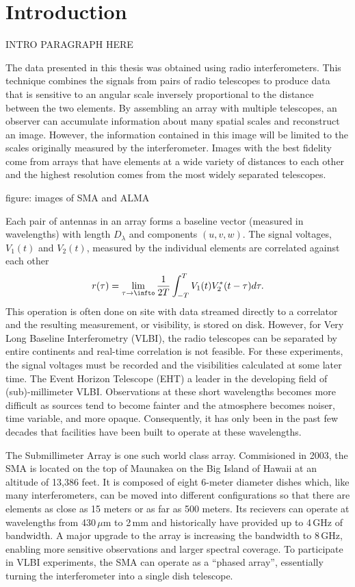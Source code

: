 \chapter{Introduction}\label{chapter:introduction}

INTRO PARAGRAPH HERE

The data presented in this thesis was obtained using radio interferometers.  This technique combines the signals
from pairs of radio telescopes to produce data that is sensitive to an angular scale inversely 
proportional to the distance between the two elements.  By assembling an array with multiple 
telescopes, an observer can accumulate information about many spatial scales and reconstruct an image.  However,
the information contained in this image will be limited to the scales originally measured by the interferometer.
Images with the best fidelity come from arrays that have elements at a wide variety of 
distances to each other and the highest resolution comes from the most widely separated telescopes.

figure: images of SMA and ALMA

Each pair of antennas in an array forms a baseline vector (measured in wavelengths) with length $D_\lambda$ and 
components $(u,v,w)$.  The signal voltages, $V_1(t)$ and $V_2(t)$, measured by the individual 
elements are correlated against each other
\begin{equation}
r(\tau) = \lim_{\tau \to \infto} \frac{1}{2T} \int_{-T}^T V_1(t) V_2^\ast(t-\tau) d\tau.
\end{equation}
This operation is often done on site with data streamed directly to a correlator and the resulting 
measurement, or visibility, is stored on disk.  However, for Very Long Baseline Interferometry (VLBI), the 
radio telescopes can be separated by entire continents and real-time correlation is not feasible.  For these
experiments, the signal voltages must be recorded and the visibilities calculated at some later time.  The Event
Horizon Telescope (EHT) a leader in the developing field of (sub)-millimeter VLBI.  Observations at these 
short wavelengths becomes more difficult as sources
tend to become fainter and the atmosphere becomes noiser, time variable, and more opaque.  Consequently, it 
has only been in the past few decades that facilities have been built to operate at these wavelengths.

The Submillimeter Array \citep[SMA][]{ho04} is one such world class array.  Commisioned in 2003, the SMA is located on the top of 
Maunakea on the Big Island of Hawaii at an altitude of 13,386 feet.
It is composed of eight 6-meter diameter dishes which, like many 
interferometers, can be moved into different configurations so that there are elements as close as 
15 meters or as far as 500 meters.  Its recievers can operate at wavelengths from 430\,$\mu$m to 2\,mm and 
historically have provided up to 4\,GHz of bandwidth.  A major upgrade to the array is increasing the bandwidth
to 8\,GHz, enabling more sensitive observations and larger spectral coverage.  To participate in VLBI 
experiments, the SMA can operate as a ``phased array'', essentially turning the interferometer into a single 
dish telescope.

